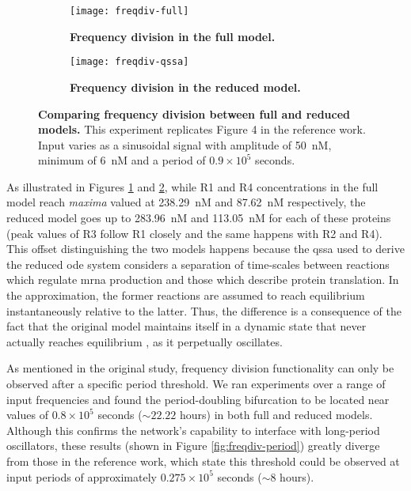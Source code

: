     \begin{figure}[!htbp]
      \centering
      \begin{subfigure}[t]{0.86\textwidth}
        \centering
        \texttt{[image: freqdiv-full]}
        \caption{\textbf{Frequency division in the full model.}}
        \label{fig:freqdiv-full}
      \end{subfigure}
      \begin{subfigure}[t]{0.86\textwidth}
        \centering
        \texttt{[image: freqdiv-qssa]}
        \caption{\textbf{Frequency division in the reduced model.}}
        \label{fig:freqdiv-qssa}
      \end{subfigure}
      \caption{\textbf{Comparing frequency division between full and reduced models.} This experiment replicates Figure 4 in the reference work. Input varies as a sinusoidal signal with amplitude of \SI{50}{\nano M}, minimum of \SI{6}{\nano M} and a period of $0.9 \times 10^5$ seconds.}
      \label{fig:freqdiv-sine}
    \end{figure}

    As illustrated in Figures \ref{fig:freqdiv-full} and \ref{fig:freqdiv-qssa}, while R1 and R4 concentrations in the full model reach \textit{maxima} valued at \SI{238.29}{\nano M} and \SI{87.62}{\nano M} respectively, the reduced model goes up to \SI{283.96}{\nano M} and \SI{113.05}{\nano M} for each of these proteins (peak values of R3 follow R1 closely and the same happens with R2 and R4).
    This offset distinguishing the two models happens because the \ac{qssa} used to derive the reduced \ac{ode} system considers a separation of time-scales between reactions which regulate \acs{mrna} production and those which describe protein translation.
    In the approximation, the former reactions are assumed to reach equilibrium instantaneously relative to the latter.
    Thus, the difference is a consequence of the fact that the original model maintains itself in a dynamic state that never actually reaches equilibrium \cite{ingalls}, as it perpetually oscillates.

    As mentioned in the original study, frequency division functionality can only be observed after a specific period threshold.
    We ran experiments over a range of input frequencies and found the period-doubling bifurcation to be located near values of $0.8 \times 10^5$ seconds ($\sim 22.22$ hours) in both full and reduced models.
    Although this confirms the network's capability to interface with long-period oscillators, these results (shown in Figure \ref{fig:freqdiv-period}) greatly diverge from those in the reference work, which state this threshold could be observed at input periods of approximately $0.275 \times 10^5$ seconds ($\sim 8$ hours).

